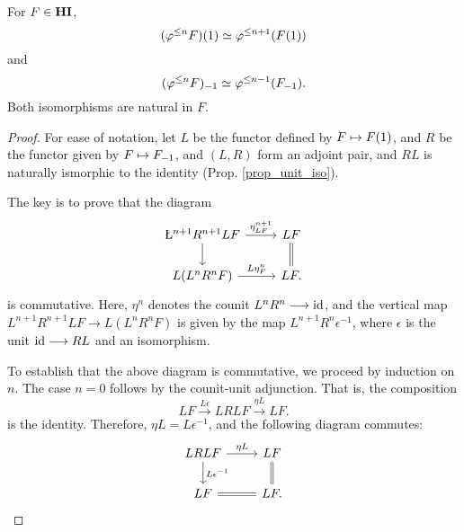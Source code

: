 \begin{prop}\label{prop_tl_L_R}
For $F \in \mathbf{HI}$, 
\[
(\varphi^{\leq n} F)(1) \simeq \varphi^{\leq n + 1}(F(1))
\]
and
\[
(\varphi^{\leq n} F)_{-1} \simeq \varphi^{\leq n - 1}(F_{-1}).
\] 
Both isomorphisms are natural in $F$.
\end{prop}
\begin{proof}
For ease of notation, let $L$ be the functor defined by $F \mapsto
F(1)$, and $R$ be the functor given by $F \mapsto F_{-1}$, and
$(L, R)$ form an adjoint pair, and $RL$ is naturally ismorphic to
the identity (Prop. \ref{prop_unit_iso}).

The key is to prove that the diagram
\begin{equation}\label{eq_Ltl_com_diag}
\begin{tikzcd}
\L^{n + 1}R^{n + 1}LF \arrow{r}{\eta^{n + 1}_{LF}} \arrow{d} &
LF \arrow[equals]{d} \\
L(L^{n}R^nF) \arrow{r}{L\eta^{n}_F} &
LF.
\end{tikzcd}
\end{equation}
is commutative. Here, $\eta^n$ denotes the counit $L^nR^n \longrightarrow \mathrm{id}$,
and the vertical map $L^{n + 1}R^{n + 1}LF \to L(L^nR^n F)$ is 
given by the map $L^{n + 1}R^n \epsilon^{-1}$, where $\epsilon$ is
the unit $\mathrm{id} \longrightarrow RL$ and an isomorphism.

To establish that the above diagram is commutative, we proceed by 
induction on $n$. The case $n = 0$ follows by the counit-unit 
adjunction. That is, the composition
\[
LF \stackrel{L\epsilon}{\to} LRLF \stackrel{\eta L}{\to} LF.
\]
is the identity. Therefore, $\eta L = L\epsilon^{-1}$, and the
following diagram commutes:
\[
\begin{tikzcd}
LRL F \arrow{r}{\eta L} \arrow{d}{L \epsilon^{-1}} &
LF \arrow[equals]{d} \\
LF \arrow[equals]{r} & LF.
\end{tikzcd}
\]


\end{proof}
